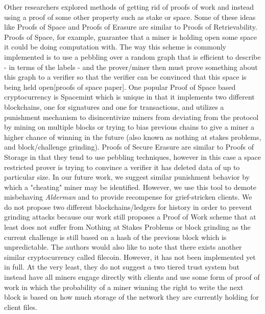 \documentclass{article}
\begin{document}
Other researchers explored methods of getting rid of proofs of work and instead using a proof of some other property such as stake or space. Some of these ideas like Proofs of Space and Proofs of Erasure are similar to Proofs of Retrievability. Proofs of Space, for example, guarantee that a miner is holding open some space it could be doing computation with. The way this scheme is commonly implemented is to use a pebbling over a random graph that is efficient to describe - in terms of the labels - and the prover/miner then must prove something about this graph to a verifier so that the verifier can be convinced that this space is being held open[proofs of space paper]. One popular Proof of Space based cryptocurrency is Spacemint which is unique in that it implements two different blockchains, one for signatures and one for transactions, and utilizes a punishment mechanism to disincentivize miners from deviating from the protocol by mining on multiple blocks or trying to bias previous chains to give a miner a higher chance of winning in the future (also known as nothing at stakes problems, and block/challenge grinding)\cite{spacemint}. Proofs of Secure Erasure are similar to Proofs of Storage in that they tend to use pebbling techniques, however in this case a space restricted prover is trying to convince a verifier it has deleted data of up to particular size.  In our future work, we suggest similar punishment behavior by which a "cheating" miner may be identified. However, we use this tool to demote misbehaving \emph{Alderman} and to provide recompense for grief-stricken clients. We do not propose two different blockchains/ledgers for history in order to prevent grinding attacks because our work still proposes a Proof of Work scheme that at least does not suffer from Nothing at Stakes Problems or block grinding as the current challenge is still based on a hash of the previous block which is unpredictable. The authors would also like to note that there exists another similar cryptocurrency called filecoin. However, it has not been implemented yet in full. At the very least, they do not suggest a two tiered trust system but instead have all miners engage directly with clients and use some form of proof of work in which the probability of a miner winning the right to write the next block is based on how much storage of the network they are currently holding for client files. \cite{filecoin}
\end{document}
